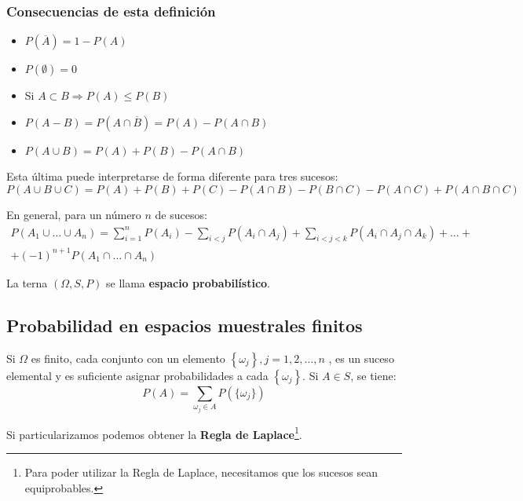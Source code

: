 \documentclass[a4paper]{book}
\begin{document}
\subsubsection*{Consecuencias de esta definición}
\vspace{\parskip}
\begin{itemize}
	\item $P\left( \overline{A} \right) = 1 - P(A)$
	\item $P(\emptyset )=0$
	\item Si $A\subset B \Longrightarrow P(A) \leq P(B)$
	\item $P(A-B) = P(A\cap \overline{B})= P(A) - P(A\cap B)$
	\item $ P(A\cup B) = P(A) + P(B) - P(A\cap B)$
\end{itemize}

\begin{nota}
	Esta última puede interpretarse de forma diferente para tres sucesos: \[P(A\cup B \cup C) = P(A) + P(B) + P(C) - P(A\cap B) - P(B\cap C) - P(A\cap C) + P(A\cap B\cap C)\]
\end{nota}

En general, para un número $n$ de sucesos: \[\begin{split}
		P\left( A_1\cup \ldots \cup A_n \right) = \sum^{n}_{i=1}{P\left( A_i \right)}-\sum_{i<j}{P\left( A_i \cap A_j \right)} +
		\sum_{i<j<k}{P\left( A_i \cap A_j \cap A_k \right)}+ \ldots + \\
		+ \left( -1 \right)^{n+1}P\left( A_1 \cap \ldots \cap A_n \right)
	\end{split}
\]

\begin{definicion}
	La terna $(\Omega, S, P)$ se llama \textbf{espacio probabilístico}.
\end{definicion}

\subsection*{Probabilidad en espacios muestrales finitos}
Si $\Omega$ es finito, cada conjunto con un elemento $\left\lbrace \omega _j \right\rbrace , j =1,2,\ldots ,n$ , es un suceso elemental y es suficiente asignar probabilidades a cada $\left\lbrace \omega _j \right\rbrace$. Si $A \in S$, se tiene: \[P(A) =\sum_{\omega _j \in A}{P(\{ \omega _j\} )}\]

Si particularizamos podemos obtener la \textbf{Regla de Laplace}\footnote{Para poder utilizar la Regla de Laplace, necesitamos que los sucesos sean equiprobables.}.
\end{document}
